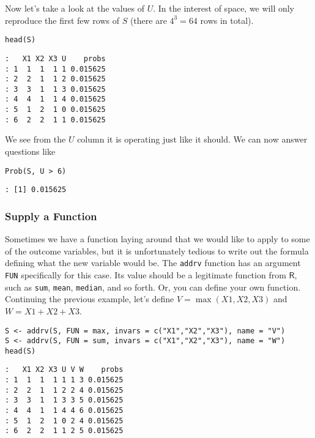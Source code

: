 Now let's take a look at the values of \(U\). In the interest of
space, we will only reproduce the first few rows of \(S\) (there are
\(4^{3}=64\) rows in total).

\begin{verbatim}
head(S)
\end{verbatim}

\begin{verbatim}
:   X1 X2 X3 U    probs
: 1  1  1  1 1 0.015625
: 2  2  1  1 2 0.015625
: 3  3  1  1 3 0.015625
: 4  4  1  1 4 0.015625
: 5  1  2  1 0 0.015625
: 6  2  2  1 1 0.015625
\end{verbatim}

We see from the \(U\) column it is operating just like it should. We
can now answer questions like

\begin{verbatim}
Prob(S, U > 6) 
\end{verbatim}

\begin{verbatim}
: [1] 0.015625
\end{verbatim}

\subsubsection{Supply a Function}
\label{sec-4-9-1-2}

Sometimes we have a function laying around that we would like to apply
to some of the outcome variables, but it is unfortunately tedious to
write out the formula defining what the new variable would be. The
\texttt{addrv} function has an argument \texttt{FUN} specifically for this case. Its
value should be a legitimate function from \(\mathsf{R}\), such as
\texttt{sum}, \texttt{mean}, \texttt{median}, and so forth. Or, you can define your own
function. Continuing the previous example, let's define
\(V=\max(X1,X2,X3)\) and \(W=X1+X2+X3\).

\begin{verbatim}
S <- addrv(S, FUN = max, invars = c("X1","X2","X3"), name = "V") 
S <- addrv(S, FUN = sum, invars = c("X1","X2","X3"), name = "W") 
head(S) 
\end{verbatim}

\begin{verbatim}
:   X1 X2 X3 U V W    probs
: 1  1  1  1 1 1 3 0.015625
: 2  2  1  1 2 2 4 0.015625
: 3  3  1  1 3 3 5 0.015625
: 4  4  1  1 4 4 6 0.015625
: 5  1  2  1 0 2 4 0.015625
: 6  2  2  1 1 2 5 0.015625
\end{verbatim}

